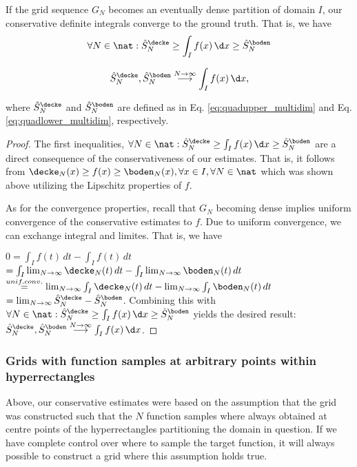 \begin{thm}\label{thm:defintconv_multidim}
If the grid sequence $G_N$ becomes an eventually dense partition of domain $I$, our conservative definite integrals converge to the ground truth. That is, we have 
\[\forall N \in \nat : \hat S^\decke_N \geq \int_I f(x) \, \d x \geq  \hat S^\boden_N \]

\[ \hat S^\decke_N, \hat S^\boden_N  \stackrel{N \to \infty}{\longrightarrow} \int_I f(x) \, \d x,  \]
 


where $\hat S^\decke_N$ and $ \hat S^\boden_N$ are defined as in Eq. \ref{eq:quadupper_multidim} and Eq. \ref{eq:quadlower_multidim}, respectively. 

\begin{proof}
The first inequalities, $\forall N \in \nat : \hat S^\decke_N \geq \int_I f(x) \, \d x \geq  \hat S^\boden_N$
are a direct consequence of the conservativeness of our estimates. That is, it follows from  $\decke_N(x) \geq f(x) \geq \boden_N(x),\forall x \in I, \forall N \in \nat $ which was shown above utilizing the Lipschitz properties of $f$.

As for the convergence properties, recall that $G_N$ becoming dense implies uniform convergence of the conservative estimates to $f$. 
Due to uniform convergence, we can exchange integral and limites. That is, we have 

$0 = \int_I f(t) \, dt - \int_I f(t) \, dt$
$=  \int_I \lim_{N \to \infty} \decke_N(t) \, dt  - \int_I \lim_{N \to \infty}  \boden_N (t) \, dt$
$\stackrel{unif. conv.}{=} \lim_{N \to \infty} \int_I \decke_N(t) \, dt  - \lim_{N \to \infty} \int_I \boden_N (t) \, dt$    
$=\lim_{N \to \infty} \hat S^\decke_N - \hat S^\boden_N $. Combining this with $\forall N \in \nat : \hat S^\decke_N \geq \int_I f(x) \, \d x \geq  \hat S^\boden_N $ yields the desired result: $\hat S^\decke_N, \hat S^\boden_N  \stackrel{N \to \infty}{\longrightarrow} \int_I f(x) \, \d x$. 


\end{proof}

\end{thm}

\subsubsection{Grids with function samples at arbitrary points within hyperrectangles}
Above, our conservative estimates were based on the assumption that the grid was constructed such that the $N$ function samples 
where always obtained at centre points of the hyperrectangles partitioning the domain in question. If we have complete control over where to sample the target function, it will always possible to construct a grid where this assumption holds true.

